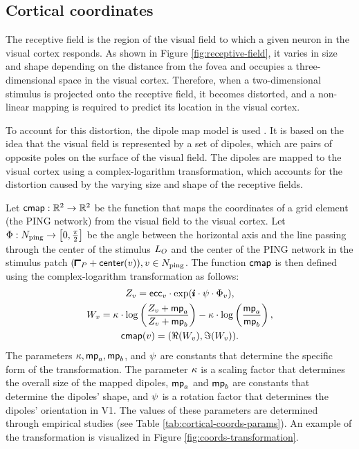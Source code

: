 \subsection{Cortical coordinates}
\label{sec:cortical-coords}

The receptive field is the region of the visual field to which a given neuron in the visual cortex responds. As shown in Figure \ref{fig:receptive-field}, it varies in size and shape depending on the distance from the fovea and occupies a three-dimensional space in the visual cortex. Therefore, when a two-dimensional stimulus is projected onto the receptive field, it becomes distorted, and a non-linear mapping is required to predict its location in the visual cortex.

To account for this distortion, the dipole map model is used \cite{Schwartz1980, Polimeni2006}. It is based on the idea that the visual field is represented by a set of dipoles, which are pairs of opposite poles on the surface of the visual field. The dipoles are mapped to the visual cortex using a complex-logarithm transformation, which accounts for the distortion caused by the varying size and shape of the receptive fields.

Let $\mathsf{cmap}: \mathbb{R}^2 \to \mathbb{R}^2$ be the function that maps the coordinates of a grid element (the PING network) from the visual field to the visual cortex. Let $\Phi: N_{\mathrm{ping}} \to \left[ 0, \frac{\pi}{2} \right]$ be the angle between the horizontal axis and the line passing through the center of the stimulus $L_O$ and the center of the PING network in the stimulus patch $(\patchstart + \centr(v)), v \in \pingnets$. The function $\mathsf{cmap}$ is then defined using the complex-logarithm transformation as follows:
\begin{equation}
\begin{gathered}
    Z_v = \mathsf{ecc}_v \cdot \exp(\pmb{i} \cdot \psi \cdot \Phi_v),
    \\
    W_v = \kappa \cdot \log \left( 
        \frac{Z_v + \mathsf{mp}_a}{Z_v + \mathsf{mp}_b}
    \right) - \kappa \cdot \log \left( 
        \frac{\mathsf{mp}_a}{\mathsf{mp}_b}
    \right),
    \\
    \mathsf{cmap}(v) = (\Re(W_v), \Im(W_v)).
\end{gathered}
\end{equation}
The parameters $\kappa, \mathsf{mp}_a, \mathsf{mp}_b$, and $\psi$ are constants that determine the specific form of the transformation. 
The parameter $\kappa$ is a scaling factor that determines the overall size of the mapped dipoles, $\mathsf{mp}_a$ and $\mathsf{mp}_b$ are constants that determine the dipoles' shape, and $\psi$ is a rotation factor that determines the dipoles' orientation in V1.
The values of these parameters are determined through empirical studies (see Table \ref{tab:cortical-coords-params}).
An example of the transformation is visualized in Figure \ref{fig:coords-transformation}.

